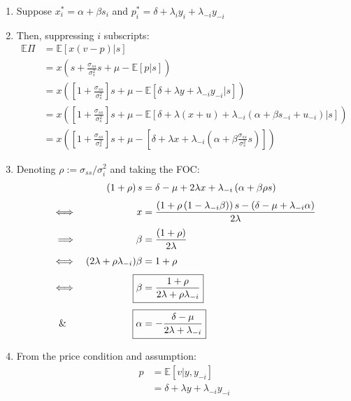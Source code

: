 \documentclass{scrartcl}
\newcommand{\rb}[1]{\ensuremath{\left(#1\right)}}
\newcommand{\sqb}[1]{\ensuremath{\left[#1\right]}}
\def\exp{\mathbb{E}}
\def\chil{\ensuremath{\rho}}
\begin{document}
			\begin{enumerate}
				\item Suppose $x_i^* = \alpha + \beta s_i $ and $p_i^* = \delta + \lambda_i y_i + \lambda_{-i} y_{-i} $
				\item Then, suppressing $i$ subscripts:
				\begin{align*}
					\exp\Pi &= \exp[x(v - p)|s]\\[.3em]
							&= x\rb{s + \frac{\sigma_{ss}}{\sigma_s^2} s + \mu - \exp[p|s]}\\[.3em]
							&= x\rb{\sqb{1 + \frac{\sigma_{ss}}{\sigma_s^2}} s + \mu - \exp[\delta + \lambda y + \lambda_{-i}y_{-i}|s]}\\[.3em]
							&= x\rb{\sqb{1 + \frac{\sigma_{ss}}{\sigma_s^2}} s + \mu - \exp[\delta + \lambda (x + u) + \lambda_{-i}(\alpha + \beta s_{-i} + u_{-i})|s]}\\[.3em]
							&= x\rb{\sqb{1 + \frac{\sigma_{ss}}{\sigma_s^2}} s + \mu - \sqb{\delta + \lambda x + \lambda_{-i} \rb{ \alpha + \beta \frac{\sigma_{ss}}{\sigma_s^2} s}}}
				\end{align*}
				\item Denoting $\chil := \sigma_{ss}/\sigma_{i}^2 $ and taking the FOC:
				\begin{align*}
					&&        	 \rb{1 + \chil }s                        &= \delta - \mu + 2\lambda x + \lambda_{-i} \rb{ \alpha + \beta \chil s} \\[.3em]
					\iff&&     	 x                                       &= \frac{\rb{1 + \chil \rb{1 - \lambda_{-i}\beta}} s - (\delta - \mu + \lambda_{-i}\alpha )}{2\lambda} \\[.3em]
					\implies&& 	 \beta                                   &= \frac{\rb{1 + \chil }}{2\lambda} \\[.3em]
					\iff&&       (2 \lambda + \chil \lambda_{-i}) \beta  &= 1 + \chil \\[.3em]
					\iff&&     	 \Aboxed{\beta                           &= \frac{1 + \chil}{2 \lambda + \chil \lambda_{-i}}} \\[.3em]
					\&\quad&&  	 \Aboxed{\alpha                          &= - \frac{\delta - \mu}{2\lambda + \lambda_{-i}}}
				\end{align*}
				\item From the price condition and assumption:
				\begin{align*}
					p &= \exp[v|y,y_{-i}] \\
					  &= \delta + \lambda y + \lambda_{-i}y_{-i}
				\end{align*}

\end{enumerate}
\end{document}
